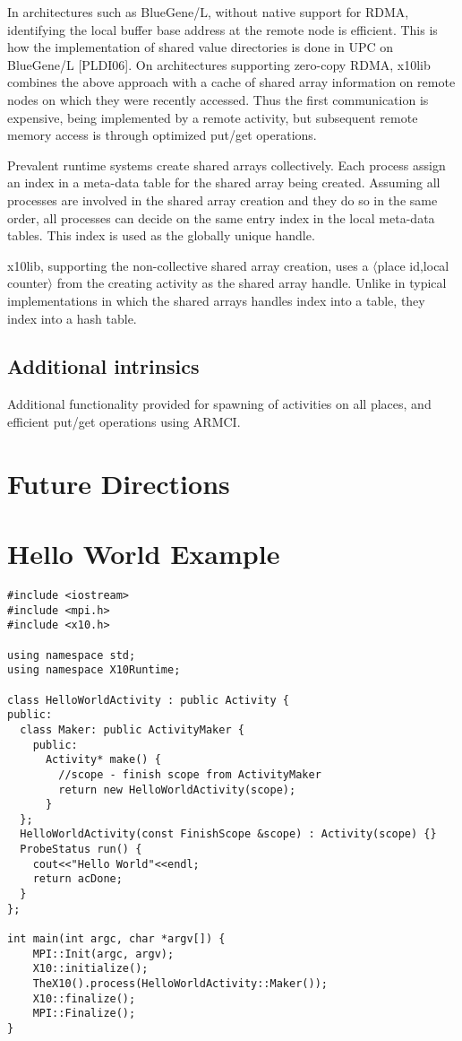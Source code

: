 \documentclass{article}
\begin{document}
In architectures such as BlueGene/L, without native support for RDMA,
identifying the local buffer base address at the remote node is
efficient. This is how the implementation of shared value directories
is done in UPC on BlueGene/L [PLDI06].  On architectures supporting
zero-copy RDMA, x10lib combines the above approach with a cache of
shared array information on remote nodes on which they were recently
accessed. Thus the first communication is expensive, being implemented
by a remote activity, but subsequent remote memory access is through
optimized put/get operations.

Prevalent runtime systems create shared arrays collectively.  Each
process assign an index in a meta-data table for the shared array
being created. Assuming all processes are involved in the shared array
creation and they do so in the same order, all processes can decide on
the same entry index in the local meta-data tables. This index is used
as the globally unique handle.

x10lib, supporting the non-collective shared array creation, uses a
$\langle$place id,local counter$\rangle$ from the creating activity as
the shared array handle. Unlike in typical implementations in which
the shared arrays handles index into a table, they index into a hash
table.


\subsection{Additional intrinsics}

Additional functionality provided for spawning of activities on all
places, and efficient put/get operations using ARMCI.

\section{Future Directions}


\section{Hello World Example}

\begin{verbatim}
#include <iostream>
#include <mpi.h>
#include <x10.h>

using namespace std;
using namespace X10Runtime;

class HelloWorldActivity : public Activity {
public:
  class Maker: public ActivityMaker {
    public:
      Activity* make() {
        //scope - finish scope from ActivityMaker
        return new HelloWorldActivity(scope); 
      }
  };
  HelloWorldActivity(const FinishScope &scope) : Activity(scope) {}
  ProbeStatus run() { 
    cout<<"Hello World"<<endl; 
    return acDone; 
  }
};

int main(int argc, char *argv[]) {
    MPI::Init(argc, argv);
    X10::initialize();
    TheX10().process(HelloWorldActivity::Maker());
    X10::finalize();
    MPI::Finalize();
}
\end{verbatim}
\end{document}
